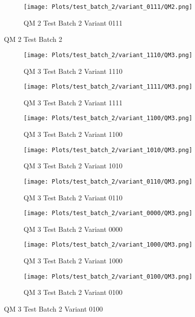 \documentclass{DissertateFigs}
\begin{document}
\begin{figure}[t!]
\medskip

    \begin{subfigure}{0.47\textwidth}
    \texttt{[image: Plots/test\_batch\_2/variant\_0111/QM2.png]}
    \caption{QM 2 Test Batch 2 Variant 0111}
    \end{subfigure}
\caption{QM 2 Test Batch 2}
    \end{figure}
\clearpage
\begin{figure}[t!]
    \begin{subfigure}{0.47\textwidth}
    \texttt{[image: Plots/test\_batch\_2/variant\_1110/QM3.png]}
    \caption{QM 3 Test Batch 2 Variant 1110}
    \end{subfigure}
    \begin{subfigure}{0.47\textwidth}
    \texttt{[image: Plots/test\_batch\_2/variant\_1111/QM3.png]}
    \caption{QM 3 Test Batch 2 Variant 1111}
    \end{subfigure}

\medskip

    \begin{subfigure}{0.47\textwidth}
    \texttt{[image: Plots/test\_batch\_2/variant\_1100/QM3.png]}
    \caption{QM 3 Test Batch 2 Variant 1100}
    \end{subfigure}
    \begin{subfigure}{0.47\textwidth}
    \texttt{[image: Plots/test\_batch\_2/variant\_1010/QM3.png]}
    \caption{QM 3 Test Batch 2 Variant 1010}
    \end{subfigure}

\medskip

    \begin{subfigure}{0.47\textwidth}
    \texttt{[image: Plots/test\_batch\_2/variant\_0110/QM3.png]}
    \caption{QM 3 Test Batch 2 Variant 0110}
    \end{subfigure}
    \begin{subfigure}{0.47\textwidth}
    \texttt{[image: Plots/test\_batch\_2/variant\_0000/QM3.png]}
    \caption{QM 3 Test Batch 2 Variant 0000}
    \end{subfigure}

\medskip

    \begin{subfigure}{0.47\textwidth}
    \texttt{[image: Plots/test\_batch\_2/variant\_1000/QM3.png]}
    \caption{QM 3 Test Batch 2 Variant 1000}
    \end{subfigure}
    \begin{subfigure}{0.47\textwidth}
    \texttt{[image: Plots/test\_batch\_2/variant\_0100/QM3.png]}
    \caption{QM 3 Test Batch 2 Variant 0100}
    \end{subfigure}


\end{figure}
\end{document}
